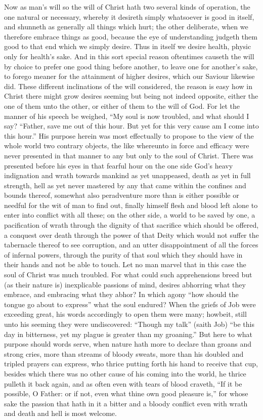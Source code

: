 Now as man’s will so the will of Christ hath two several kinds of operation, the one natural or necessary, whereby it desireth simply whatsoever is good in itself, and shunneth as generally all things which hurt; the other deliberate, when we therefore embrace things as good, because the eye of understanding judgeth them good to that end which we simply desire. Thus in itself we desire health, physic only for health’s sake. And in this sort special reason oftentimes causeth the will by choice to prefer one good thing before another, to leave one for another’s sake, to forego meaner for the attainment of higher desires, which our Saviour likewise did.
These different inclinations of the will considered, the reason is easy how in Christ there might grow desires seeming but being not indeed opposite, either the one of them unto the other, or either of them to the will of God. For let the manner of his speech be weighed, “My soul is now troubled, and what should I say? “Father, save me out of this hour. But yet for this very cause am I come into this hour.” His purpose herein was most effectually to propose to the view of the whole world two contrary objects, the like whereunto in force and efficacy were never presented in that manner to any but only to the soul of Christ. There was presented before his eyes in that fearful hour on the one side God’s heavy indignation and wrath towards mankind as yet unappeased, death as yet in full strength, hell as yet never mastered by any that came within the confines and bounds thereof, somewhat also peradventure more than is either possible or needful for the wit of man to find out, finally himself flesh and blood left alone to enter into conflict with all these; on the other side, a  world to be saved by one, a pacification of wrath through the dignity of that sacrifice which should be offered, a conquest over death through the power of that Deity which would not suffer the tabernacle thereof to see corruption, and an utter disappointment of all the forces of infernal powers, through the purity of that soul which they should have in their hands and not be able to touch. Let no man marvel that in this case the soul of Christ was much troubled. For what could such apprehensions breed but (as their nature is) inexplicable passions of mind, desires abhorring what they embrace, and embracing what they abhor? In which agony “how should the tongue go about to express” what the soul endured? When the griefs of Job were exceeding great, his words accordingly to open them were many; howbeit, still unto his seeming they were undiscovered: “Though my talk” (saith Job) “be this day in bitterness, yet my plague is greater than my groaning.” But here to what purpose should words serve, when nature hath more to declare than groans and strong cries, more than streams of bloody sweats, more than his doubled and tripled prayers can express, who thrice putting forth his hand to receive that cup, besides which there was no other cause of his coming into the world, he thrice pulleth it back again, and as often even with tears of blood craveth, “If it be possible, O Father: or if not, even what thine own good pleasure is,” for whose sake the passion that hath in it a bitter and a bloody conflict even with wrath and death and hell is most welcome.
